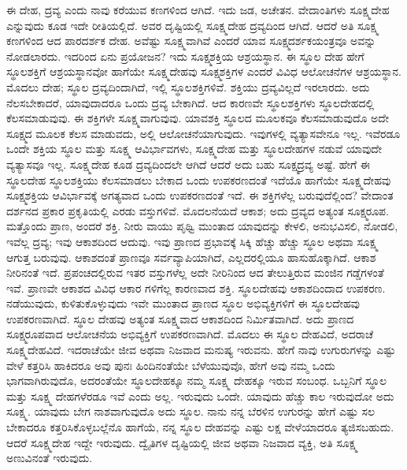 ಈ ದೇಹ, ದ್ರವ್ಯ ಎಂದು ನಾವು ಕರೆಯುವ ಕಣಗಳಿಂದ ಆಗಿದೆ. ಇದು ಜಡ, ಅಚೇತನ. ವೇದಾಂತಿಗಳು ಸೂಕ್ಷ್ಮದೇಹ ಎನ್ನುವುದು ಕೂಡ ಇದೇ ರೀತಿಯಲ್ಲಿದೆ. ಅವರ ದೃಷ್ಟಿಯಲ್ಲಿ ಸೂಕ್ಷ್ಮದೇಹ ದ್ರವ್ಯದಿಂದ ಆಗಿದೆ. ಆದರೆ ಅತಿ ಸೂಕ್ಷ್ಮ ಕಣಗಳಿಂದ ಆದ ಪಾರದರ್ಶಕ ದೇಹ. ಅವೆಷ್ಟು ಸೂಕ್ಷ್ಮವಾಗಿವೆ ಎಂದರೆ ಯಾವ ಸೂಕ್ಷ್ಮದರ್ಶಕಯಂತ್ರವೂ ಅವನ್ನು ನೋಡಲಾರದು. ಇದರಿಂದ ಏನು ಪ್ರಯೋಜನ? ಇದು ಸೂಕ್ಷ್ಮಶಕ್ತಿಯ ಆಶ್ರಯಸ್ಥಾನ. ಈ ಸ್ಥೂಲ ದೇಹ ಹೇಗೆ ಸ್ಥೂಲಶಕ್ತಿಗೆ ಆಶ್ರಯಸ್ಥಾನವೋ ಹಾಗೆಯೇ ಸೂಕ್ಷ್ಮದೇಹವು ಸೂಕ್ಷ್ಮಶಕ್ತಿಗಳ ಎಂದರೆ ವಿವಿಧ ಆಲೋಚನೆಗಳ ಆಶ್ರಯಸ್ಥಾನ. ಮೊದಲು ದೇಹ; ಸ್ಥೂಲ ದ್ರವ್ಯದಿಂದಾಗಿದೆ, ಇಲ್ಲಿ ಸ್ಥೂಲಶಕ್ತಿಗಳಿವೆ. ಶಕ್ತಿಯು ದ್ರವ್ಯವಿಲ್ಲದೆ ಇರಲಾರದು. ಅದು ನೆಲಸಬೇಕಾದರೆ, ಯಾವುದಾದರೂ ಒಂದು ದ್ರವ್ಯ ಬೇಕಾಗಿದೆ. ಆದ ಕಾರಣವೇ ಸ್ಥೂಲಶಕ್ತಿಗಳು ಸ್ಥೂಲದೇಹದಲ್ಲಿ ಕೆಲಸಮಾಡುವುವು. ಈ ಶಕ್ತಿಗಳೇ ಸೂಕ್ಷ್ಮವಾಗುವುವು. ಯಾವಶಕ್ತಿ ಸ್ಥೂಲದ ಮೂಲಕವೂ ಕೆಲಸಮಾಡುವುದೊ ಅದೇ ಸೂಕ್ಷ್ಮದ ಮೂಲಕ ಕೆಲಸ ಮಾಡುವದು, ಅಲ್ಲಿ ಆಲೋಚನೆಯಾಗುವುದು. ಇವುಗಳಲ್ಲಿ ವ್ಯತ್ಯಾಸವೇನೂ ಇಲ್ಲ. ಇವೆರಡೂ ಒಂದೇ ಶಕ್ತಿಯ ಸ್ಥೂಲ ಮತ್ತು ಸೂಕ್ಷ್ಮ ಆವಿರ್ಭಾವಗಳು, ಸೂಕ್ಷ್ಮದೇಹ ಮತ್ತು ಸ್ಥೂಲದೇಹಗಳ ನಡುವೆ ಯಾವುದೇ ವ್ಯತ್ಯಾಸವೂ ಇಲ್ಲ. ಸೂಕ್ಷ್ಮದೇಹ ಕೂಡ ದ್ರವ್ಯದಿಂದಲೇ ಆಗಿದೆ ಆದರೆ ಅದು ಬಹು ಸೂಕ್ಷ್ಮದ್ರವ್ಯ ಅಷ್ಟೆ. ಹೇಗೆ ಈ ಸ್ಥೂಲದೇಹ ಸ್ಥೂಲಶಕ್ತಿಯು ಕೆಲಸಮಾಡಲು ಬೇಕಾದ ಒಂದು ಉಪಕರಣದಂತೆ ಇದೆಯೊ ಹಾಗೆಯೇ ಸೂಕ್ಷ್ಮದೇಹವು ಸೂಕ್ಷ್ಮಶಕ್ತಿಯ ಆವಿರ್ಭಾವಕ್ಕೆ ಅಗತ್ಯವಾದ ಒಂದು ಉಪಕರಣದಂತೆ ಇದೆ. ಈ ಶಕ್ತಿಗಳೆಲ್ಲ ಬರುವುದೆಲ್ಲಿಂದ? ವೇದಾಂತ ದರ್ಶನದ ಪ್ರಕಾರ ಪ್ರಕೃತಿಯಲ್ಲಿ ಎರಡು ವಸ್ತುಗಳಿವೆ. ಮೊದಲನೆಯದೆ ಆಕಾಶ; ಅದು ದ್ರವ್ಯದ ಅತ್ಯಂತ ಸೂಕ್ಷ್ಮರೂಪ. ಮತ್ತೊಂದು ಪ್ರಾಣ, ಅಂದರೆ ಶಕ್ತಿ. ನೀರು ವಾಯು ಪೃಥ್ವಿ ಮುಂತಾದ ಯಾವುದನ್ನು ಕೇಳಲಿ, ಅನುಭವಿಸಲಿ, ನೋಡಲಿ, ಇವೆಲ್ಲ ದ್ರವ್ಯ; ಇವು ಆಕಾಶದಿಂದ ಆದುವು. ಇವು ಪ್ರಾಣದ ಪ್ರಭಾವಕ್ಕೆ ಸಿಕ್ಕಿ ಹೆಚ್ಚು ಹೆಚ್ಚು ಸ್ಥೂಲ ಅಥವಾ ಸೂಕ್ಷ್ಮ ಆಗುತ್ತ ಬರುವುವು. ಆಕಾಶದಂತೆ ಪ್ರಾಣವೂ ಸರ್ವವ್ಯಾಪಿಯಾಗಿದೆ, ಎಲ್ಲದರಲ್ಲಿಯೂ ಹಾಸುಹೊಕ್ಕಾಗಿದೆ. ಆಕಾಶ ನೀರಿನಂತೆ ಇದೆ. ಪ್ರಪಂಚದಲ್ಲಿರುವ ಇತರ ವಸ್ತುಗಳೆಲ್ಲ ಅದೇ ನೀರಿನಿಂದ ಆದ ತೇಲುತ್ತಿರುವ ಮಂಜಿನ ಗಡ್ಡೆಗಳಂತೆ ಇವೆ. ಪ್ರಾಣವೇ ಆಕಾಶದ ವಿವಿಧ ಆಕಾರ ಗಳಿಗೆಲ್ಲ ಕಾರಣವಾದ ಶಕ್ತಿ. ಸ್ಥೂಲದೇಹವು ಆಕಾಶದಿಂದಾದ ಉಪಕರಣ. ನಡೆಯುವುದು, ಕುಳಿತುಕೊಳ್ಳುವುದು ಇವೇ ಮುಂತಾದ ಪ್ರಾಣದ ಸ್ಥೂಲ ಅಭಿವ್ಯಕ್ತಿಗಳಿಗೆ ಈ ಸ್ಥೂಲದೇಹವು ಉಪಕರಣವಾಗಿದೆ. ಸ್ಥೂಲ ದೇಹವು ಅತ್ಯಂತ ಸೂಕ್ಷ್ಮವಾದ ಆಕಾಶದಿಂದ ನಿರ್ಮಿತವಾಗಿದೆ. ಅದು ಪ್ರಾಣದ ಸೂಕ್ಷ್ಮರೂಪವಾದ ಆಲೋಚನೆಯ ಅಭಿವ್ಯಕ್ತಿಗೆ ಉಪಕರಣವಾಗಿದೆ. ಮೊದಲು ಈ ಸ್ಥೂಲ ದೇಹವಿದೆ, ಅದರಾಚೆ ಸೂಕ್ಷ್ಮದೇಹವಿದೆ. ಇದರಾಚೆಯೇ ಜೀವ ಅಥವಾ ನಿಜವಾದ ಮನುಷ್ಯ ಇರುವನು. ಹೇಗೆ ನಾವು ಉಗುರುಗಳನ್ನು ಎಷ್ಟು ವೇಳೆ ಕತ್ತರಿಸಿ ಹಾಕಿದರೂ ಅವು ಪುನಃ ಹಿಂದಿನಂತೆಯೇ ಬೆಳೆಯುವುವೊ, ಹೇಗೆ ಅವು ನಮ್ಮ ಒಂದು ಭಾಗವಾಗಿರುವುದೊ, ಅದರಂತೆಯೇ ಸ್ಥೂಲದೇಹಕ್ಕೂ ನಮ್ಮ ಸೂಕ್ಷ್ಮ ದೇಹಕ್ಕೂ ಇರುವ ಸಂಬಂಧ. ಒಬ್ಬನಿಗೆ ಸ್ಥೂಲ ಮತ್ತು ಸೂಕ್ಷ್ಮ ದೇಹಗಳೆರಡೂ ಇವೆ ಎಂದು ಅಲ್ಲ. ಇರುವುದು ಒಂದೇ. ಯಾವುದು ಹೆಚ್ಚು ಕಾಲ ಇರುವುದೋ ಅದು ಸೂಕ್ಷ್ಮ. ಯಾವುದು ಬೇಗ ನಾಶವಾಗುವುದೊ ಅದು ಸ್ಥೂಲ. ನಾನು ನನ್ನ ಬೆರಳಿನ ಉಗುರನ್ನು ಹೇಗೆ ಎಷ್ಟು ಸಲ ಬೇಕಾದರೂ ಕತ್ತರಿಸಿಕೊಳ್ಳಬಲ್ಲೆನೊ ಹಾಗೆಯೆ, ನನ್ನ ಸ್ಥೂಲ ದೇಹವನ್ನು ಎಷ್ಟು ಲಕ್ಷ ವೇಳೆಯಾದರೂ ತ್ಯಜಿಸಬಹುದು. ಆದರೆ ಸೂಕ್ಷ್ಮದೇಹ ಇದ್ದೇ ಇರುವುದು. ದ್ವೈತಿಗಳ ದೃಷ್ಟಿಯಲ್ಲಿ ಜೀವ ಅಥವಾ ನಿಜವಾದ ವ್ಯಕ್ತಿ, ಅತಿ ಸೂಕ್ಷ್ಮ ಅಣುವಿನಂತೆ ಇರುವುದು.

